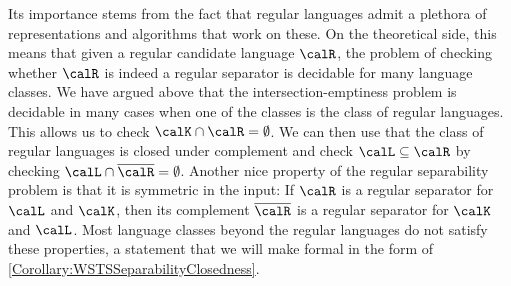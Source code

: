 \documentclass[../../diss.tex]{subfiles}
\begin{document}
Its importance stems from the fact that regular languages admit a plethora of representations and algorithms that work on these.
On the theoretical side, this means that given a regular candidate language $\calR$, the problem of checking whether $\calR$ is indeed a regular separator is decidable for many language classes.
We have argued above that the intersection-emptiness problem is decidable in many cases when one of the classes is the class of regular languages.
This allows us to check $\calK \cap \calR = \emptyset$.
We can then use that the class of regular languages is closed under complement and check $\calL \subseteq \calR$ by checking $\calL \cap \overline{\calR} = \emptyset$.
Another nice property of the regular separability problem is that it is symmetric in the input: If $\calR$ is a regular separator for $\calL$ and $\calK$, then its complement $\overline{\calR}$ is a regular separator for $\calK$ and $\calL$.
Most language classes beyond the regular languages do not satisfy these properties, a statement that we will make formal in the form of \cref{Corollary:WSTSSeparabilityClosedness}.
\end{document}
